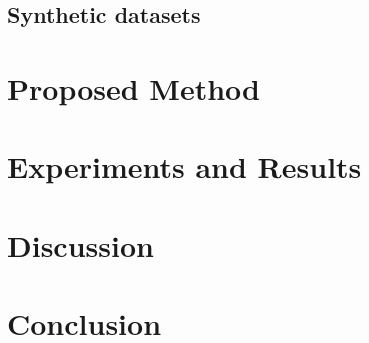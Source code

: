 \documentclass[conference]{IEEEtran} %
\begin{document}
	\subsection{Synthetic datasets}
		 
	
	
	
	
	\section{Proposed Method}
	
	\section{Experiments and Results}
	
	\section{Discussion}
	
	\section{Conclusion}
	
	
	
\end{document}
